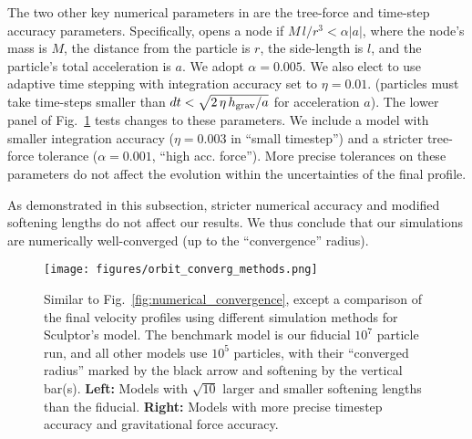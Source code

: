 The two other key numerical parameters in \gadget{} are the tree-force
and time-step accuracy parameters. Specifically, \gadget{} opens a node
if \(M\,l/r^3 < \alpha |a|\), where the node's mass is \(M\), the
distance from the particle is \(r\), the side-length is \(l\), and the
particle's total acceleration is \(a\). We adopt \(\alpha =0.005\). We
also elect to use adaptive time stepping with integration accuracy set
to \(\eta=0.01\). (particles must take time-steps smaller than
\(dt < \sqrt{2\,\eta\,h_{\rm grav} / a}\) for acceleration \(a\)). The
lower panel of Fig.~\ref{fig:methods_convergence} tests changes to these
parameters. We include a model with smaller integration accuracy
(\(\eta=0.003\) in ``small timestep'') and a stricter tree-force
tolerance (\(\alpha=0.001\), ``high acc. force''). More precise
tolerances on these parameters do not affect the evolution within the
uncertainties of the final profile.

As demonstrated in this subsection, stricter numerical accuracy and
modified softening lengths do not affect our results. We thus conclude
that our simulations are numerically well-converged (up to the
``convergence'' radius).

\begin{figure}
\centering
\texttt{[image: figures/orbit\_converg\_methods.png]}
\caption[Numerical methods convergence]{Similar to
Fig.~\ref{fig:numerical_convergence}, except a comparison of the final
velocity profiles using different simulation methods for Sculptor's
\smallperi{} model. The benchmark model is our fiducial \(10^7\)
particle run, and all other models use \(10^5\) particles, with their
``converged radius'' marked by the black arrow and softening by the
vertical bar(s). \textbf{Left:} Models with \(\sqrt{10}\) larger and
smaller softening lengths than the fiducial. \textbf{Right:} Models with
more precise timestep accuracy and gravitational force
accuracy.}\label{fig:methods_convergence}
\end{figure}
